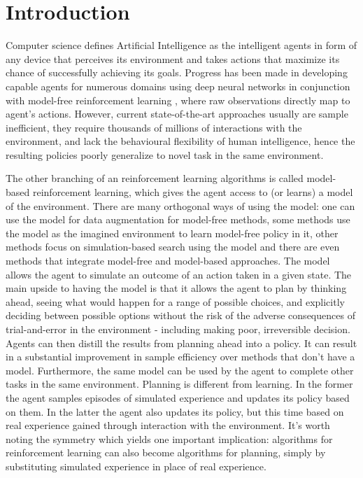 \section{Introduction}

 Computer science defines Artificial Intelligence as the intelligent agents in form of any device that perceives its environment and takes actions that maximize its chance of successfully achieving its goals. Progress has been made in developing capable agents for numerous domains using deep neural networks in conjunction with model-free reinforcement learning \cite{Algo.Rainbow}\cite{Algo.A3C}\cite{Algo.PPO}, where raw observations directly map to agent's actions. However, current state-of-the-art approaches usually are sample inefficient, they require thousands of millions of interactions with the environment, and lack the behavioural flexibility of human intelligence, hence the resulting policies poorly generalize to novel task in the same environment.

The other branching of an reinforcement learning algorithms is called model-based reinforcement learning, which gives the agent access to (or learns) a model of the environment. There are many orthogonal ways of using the model: one can use the model for data augmentation for model-free methods\cite{Algo.MBVE}, some methods use the model as the imagined environment to learn model-free policy in it\cite{Algo.WorldModels}, other methods focus on simulation-based search using the model\cite{Algo.AlphaZero} and there are even methods that integrate model-free and model-based approaches\cite{Algo.I2A}. The model allows the agent to simulate an outcome of an action taken in a given state. The main upside to having the model is that it allows the agent to plan by thinking ahead, seeing what would happen for a range of possible choices, and explicitly deciding between possible options without the risk of the adverse consequences of trial-and-error in the environment - including making poor, irreversible decision. Agents can then distill the results from planning ahead into a policy. It can result in a substantial improvement in sample efficiency over methods that don’t have a model. Furthermore, the same model can be used by the agent to complete other tasks in the same environment.
Planning is different from learning. In the former the agent samples episodes of simulated experience and updates its policy based on them. In the latter the agent also updates its policy, but this time based on real experience gained through interaction with the environment. It's worth noting the symmetry which yields one important implication: algorithms for reinforcement learning can also become algorithms for planning, simply by substituting simulated experience in place of real experience.


